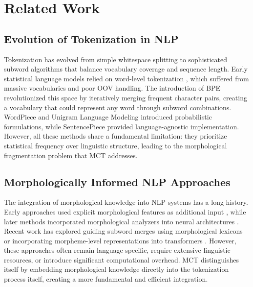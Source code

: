 \documentclass[conference]{IEEEtran}
\begin{document}
\section{Related Work}
\label{sec:related}

\subsection{Evolution of Tokenization in NLP}
Tokenization has evolved from simple whitespace splitting to sophisticated subword algorithms that balance vocabulary coverage and sequence length. Early statistical language models relied on word-level tokenization \cite{mikolov2013distributed}, which suffered from massive vocabularies and poor OOV handling. The introduction of BPE \cite{sennrich2016neural} revolutionized this space by iteratively merging frequent character pairs, creating a vocabulary that could represent any word through subword combinations. WordPiece \cite{schuster2012japanese} and Unigram Language Modeling \cite{kudo2018subword} introduced probabilistic formulations, while SentencePiece \cite{kudo2018sentencepiece} provided language-agnostic implementation. However, all these methods share a fundamental limitation: they prioritize statistical frequency over linguistic structure, leading to the morphological fragmentation problem that MCT addresses.

\subsection{Morphologically Informed NLP Approaches}
The integration of morphological knowledge into NLP systems has a long history. Early approaches used explicit morphological features as additional input \cite{cotterell2018morphologically, kim2016character}, while later methods incorporated morphological analyzers into neural architectures \cite{li2023parameter, pires2019multilingual}. Recent work has explored guiding subword merges using morphological lexicons \cite{goyal2022revisiting} or incorporating morpheme-level representations into transformers \cite{wu2022revisiting, liu2023tokenization}. However, these approaches often remain language-specific, require extensive linguistic resources, or introduce significant computational overhead. MCT distinguishes itself by embedding morphological knowledge directly into the tokenization process itself, creating a more fundamental and efficient integration.
\end{document}
